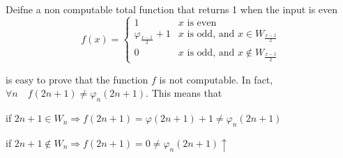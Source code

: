 \begin{exercise}
  Deifne a non computable total function that returns 1 when the input
  is even
  \[
    f(x) = \begin{cases}
      1 & x \mbox{ is even} \\
      \varphi_{\frac{x-1}{2}} + 1 & x \mbox{ is odd, and } x \in
      W_{\frac{x-1}{2}} \\
      0 & x \mbox{ is odd, and } x \notin W_{\frac{x-1}{2}}
    \end{cases}
  \]

  is easy to prove that the function $f$ is not computable. In fact,
  $\forall n \quad f(2n + 1) \neq \varphi_n(2n+1)$. This means that

  if
  $2n+1 \in W_n \Rightarrow f(2n+1) = \varphi(2n+1) + 1 \neq
  \varphi_n(2n+1)$

  if
  $2n+1 \notin W_n \Rightarrow f(2n+1) = 0 \neq \varphi_n(2n+1)
  \uparrow $

\end{exercise}



